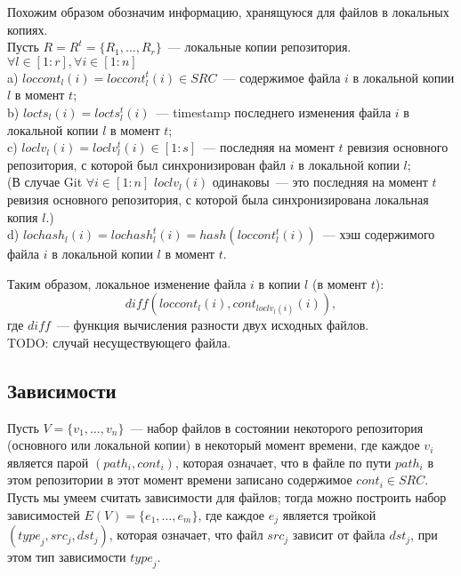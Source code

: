 Похожим образом обозначим информацию, хранящуюся для файлов в локальных копиях.\\
Пусть $R = R^t = \{R_1, \dots, R_r\}$~--- локальные копии репозитория.\\
$\forall l \in [1:r], \forall i \in [1:n]$\\
\indent a) $loccont_l(i) = loccont_l^t(i) \in SRC$~--- содержимое файла $i$ в локальной копии $l$ в момент $t$;\\
\indent b) $locts_l(i) = locts_l^t(i)$~--- timestamp последнего изменения файла $i$ в локальной копии $l$ в момент $t$;\\
\indent c) $loclv_l(i) = loclv_l^t(i) \in {[1:s]}$~--- последняя на момент $t$ ревизия основного репозитория, с которой был синхронизирован файл $i$ в локальной копии $l$;\\
(В случае Git $\forall i \in [1:n]$ $loclv_l(i)$ одинаковы~--- это последняя на момент $t$ ревизия основного репозитория, с которой была синхронизирована локальная копия $l$.)\\
\indent d) $lochash_l(i) = lochash_l^t(i) = hash(loccont_l^t(i)) $~--- хэш содержимого файла $i$ в локальной копии $l$ в момент $t$.

Таким образом, локальное изменение файла $i$ в копии $l$ (в момент $t$): $$\mathit{diff}(loccont_l(i), cont_{loclv_l(i)}(i)),$$ где $\mathit{diff}$~--- функция вычисления разности двух исходных файлов.\\
TODO: случай несуществующего файла.

\subsection{Зависимости}

Пусть $V = \{v_1, \dots, v_n\}$~--- набор файлов в состоянии некоторого репозитория (основного или локальной копии) в некоторый момент времени, где каждое $v_i$ является парой $(path_i, cont_i)$, которая означает, что в файле по пути $path_i$ в этом репозитории в этот момент времени записано содержимое $cont_i \in SRC$. Пусть мы умеем считать зависимости для файлов; тогда можно построить набор зависимостей $E(V) = \{e_1, \dots, e_m\}$, где каждое $e_j$ является тройкой $(\textit{type}_j, \textit{src}_j, \textit{dst}_j)$, которая означает, что файл $\textit{src}_j$ зависит от файла $\textit{dst}_j$, при этом тип зависимости $\textit{type}_j$.\\

